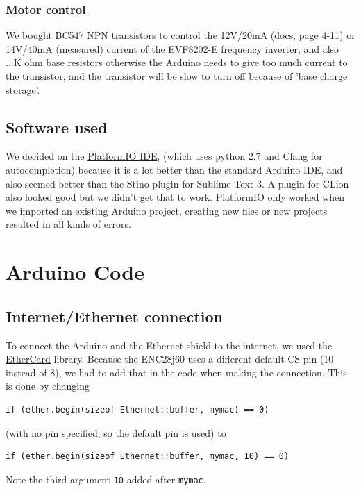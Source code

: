 \documentclass{article}
\begin{document}
		\subsubsection{Motor control}
		We bought BC547 NPN transistors to control the 12V/20mA (\href{http://download.lenze.com/TD/8201-8204__Inverter__v02-08__EN.pdf }{docs}, page 4-11) or 14V/40mA (measured) current of the EVF8202-E frequency inverter, and also ...K ohm base resistors otherwise the Arduino needs to give too much current to the transistor, and the transistor will be slow to turn off because of 'base charge storage'.
	
		\subsection{Software used}
		We decided on the \href{http://platformio.org/platformio-ide}{PlatformIO IDE}, (which uses python 2.7 and Clang for autocompletion) because it is a lot better than the standard Arduino IDE, and also seemed better than the Stino plugin for Sublime Text 3. A plugin for CLion also looked good but we didn't get that to work. PlatformIO only worked when we imported an existing Arduino project, creating new files or new projects resulted in all kinds of errors.
	
	\section{Arduino Code}
		\subsection{Internet/Ethernet connection}
			To connect the Arduino and the Ethernet shield to the internet, we used the \href{https://github.com/jcw/ethercard}{EtherCard} library. Because the ENC28j60 uses a different default CS pin (10 instead of 8), we had to add that in the code when making the connection. This is done by changing
			\begin{lstlisting}
if (ether.begin(sizeof Ethernet::buffer, mymac) == 0)
			\end{lstlisting}
			(with no pin specified, so the default pin is used) to
			\begin{lstlisting}
if (ether.begin(sizeof Ethernet::buffer, mymac, 10) == 0)
			\end{lstlisting}
			Note the third argument \lstinline|10| added after \lstinline|mymac|.
\end{document}
